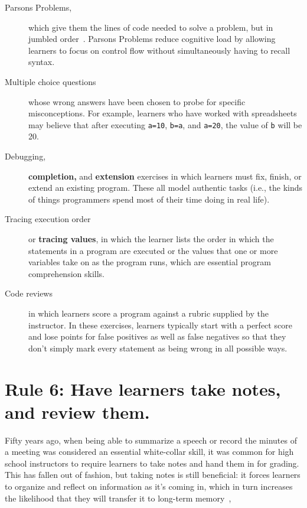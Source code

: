 \documentclass[10pt,letterpaper]{article}
\newcommand{\rulemajor}[1]{\section{#1}}
\begin{document}
\begin{description}

\item[Parsons Problems,]
  which give them the lines of code needed to solve a problem,
  but in jumbled order~\cite{Pars2006,Morr2016,Eric2017}.
  Parsons Problems reduce cognitive load by allowing learners to focus on control flow
  without simultaneously having to recall syntax.

\item[Multiple choice questions]
  whose wrong answers have been chosen to probe for specific misconceptions.
  For example, learners who have worked with spreadsheets may believe that
  after executing \texttt{a=10}, \texttt{b=a}, and \texttt{a=20},
  the value of \texttt{b} will be 20.

\item[Debugging,] \textbf{completion,} and \textbf{extension} exercises
  in which learners must fix, finish, or extend an existing program.
  These all model authentic tasks
  (i.e., the kinds of things programmers spend most of their time doing in real life).

\item[Tracing execution order] or \textbf{tracing values},
  in which the learner lists the order in which the statements in a program are executed
  or the values that one or more variables take on as the program runs,
  which are essential program comprehension skills.

\item[Code reviews]
  in which learners score a program against a rubric supplied by the instructor.
  In these exercises,
  learners typically start with a perfect score and lose points for false positives as well as false negatives
  so that they don't simply mark every statement as being wrong in all possible ways.
  
\end{description}

\rulemajor{Rule 6: Have learners take notes, and review them.}

Fifty years ago,
when being able to summarize a speech or record the minutes of a meeting
was considered an essential white-collar skill,
it was common for high school instructors to require learners to take notes
and hand them in for grading.
This has fallen out of fashion,
but taking notes is still beneficial:
it forces learners to organize and reflect on information as it's coming in,
which in turn increases the likelihood that they will transfer it to long-term memory~\cite{Aike1975,Boha2011},
\end{document}
